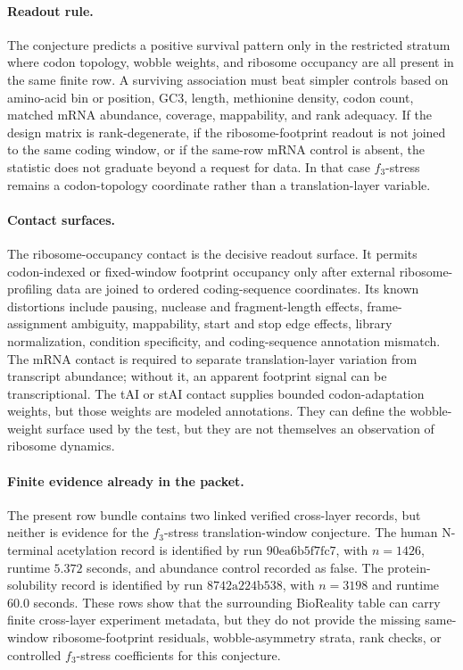 \paragraph{Readout rule.}
The conjecture predicts a positive survival pattern only in the restricted stratum where codon topology, wobble weights, and ribosome occupancy are all present in the same finite row. A surviving association must beat simpler controls based on amino-acid bin or position, GC3, length, methionine density, codon count, matched mRNA abundance, coverage, mappability, and rank adequacy. If the design matrix is rank-degenerate, if the ribosome-footprint readout is not joined to the same coding window, or if the same-row mRNA control is absent, the statistic does not graduate beyond a request for data. In that case $f_3$-stress remains a codon-topology coordinate rather than a translation-layer variable.

\paragraph{Contact surfaces.}
The ribosome-occupancy contact is the decisive readout surface. It permits codon-indexed or fixed-window footprint occupancy only after external ribosome-profiling data are joined to ordered coding-sequence coordinates. Its known distortions include pausing, nuclease and fragment-length effects, frame-assignment ambiguity, mappability, start and stop edge effects, library normalization, condition specificity, and coding-sequence annotation mismatch. The mRNA contact is required to separate translation-layer variation from transcript abundance; without it, an apparent footprint signal can be transcriptional. The tAI or stAI contact supplies bounded codon-adaptation weights, but those weights are modeled annotations. They can define the wobble-weight surface used by the test, but they are not themselves an observation of ribosome dynamics.

\paragraph{Finite evidence already in the packet.}
The present row bundle contains two linked verified cross-layer records, but neither is evidence for the $f_3$-stress translation-window conjecture. The human N-terminal acetylation record is identified by run $90\mathrm{ea}6\mathrm{b}5\mathrm{f}7\mathrm{fc}7$, with $n=1426$, runtime $5.372$ seconds, and abundance control recorded as false. The protein-solubility record is identified by run $8742\mathrm{a}224\mathrm{b}538$, with $n=3198$ and runtime $60.0$ seconds. These rows show that the surrounding BioReality table can carry finite cross-layer experiment metadata, but they do not provide the missing same-window ribosome-footprint residuals, wobble-asymmetry strata, rank checks, or controlled $f_3$-stress coefficients for this conjecture.

